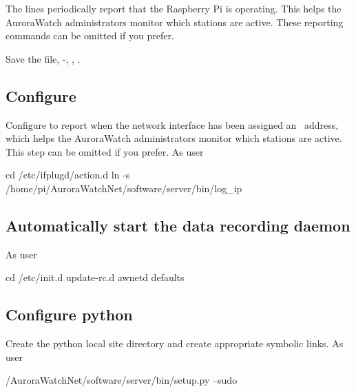 
The  lines periodically report that the Raspberry Pi is
operating. This helps the AuroraWatch administrators monitor which
stations are active. These reporting commands can be omitted if you
prefer.

Save the file, -, ,
\myreturn.

\subsection{Configure \protect{}}

Configure  to report when the network interface has
been assigned an \ip\ address, which helps the AuroraWatch
administrators monitor which stations are active. This step can be
omitted if you prefer. As user \rootUser
\begin{Cmd}
cd /etc/ifplugd/action.d
ln -s /home/pi/AuroraWatchNet/software/server/bin/log_ip
\end{Cmd}

\subsection{Automatically start the data recording daemon}
As user \rootUser
\begin{Cmd}
cd /etc/init.d
update-rc.d awnetd defaults
\end{Cmd}

%

\subsection{Configure python}

Create the python local site directory and create appropriate symbolic
links. As user \piUser
\begin{Cmd}
\mytilde/AuroraWatchNet/software/server/bin/setup.py --sudo
\end{Cmd}

